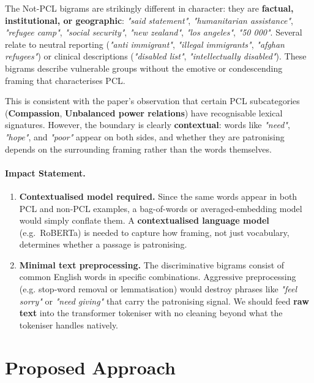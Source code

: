 \documentclass[11pt,a4paper]{article}
\begin{document}
The Not-PCL bigrams are strikingly different in character: they are \textbf{factual, institutional, or geographic}: \textit{"said statement"}, \textit{"humanitarian assistance"}, \textit{"refugee camp"}, \textit{"social security"}, \textit{"new zealand"}, \textit{"los angeles"}, \textit{"50 000"}. Several relate to neutral reporting (\textit{"anti immigrant"}, \textit{"illegal immigrants"}, \textit{"afghan refugees"}) or clinical descriptions (\textit{"disabled list"}, \textit{"intellectually disabled"}). These bigrams describe vulnerable groups without the emotive or condescending framing that characterises PCL.

This is consistent with the paper's observation that certain PCL subcategories (\textbf{Compassion}, \textbf{Unbalanced power relations}) have recognisable lexical signatures. However, the boundary is clearly \textbf{contextual}: words like \textit{"need"}, \textit{"hope"}, and \textit{"poor"} appear on both sides, and whether they are patronising depends on the surrounding framing rather than the words themselves.

\paragraph{Impact Statement.}

\begin{enumerate}
    \item \textbf{Contextualised model required.} Since the same words appear in both PCL and non-PCL examples, a bag-of-words or averaged-embedding model would simply conflate them. A \textbf{contextualised language model} (e.g.\ RoBERTa) is needed to capture how framing, not just vocabulary, determines whether a passage is patronising.
    \item \textbf{Minimal text preprocessing.} The discriminative bigrams consist of common English words in specific combinations. Aggressive preprocessing (e.g. stop-word removal or lemmatisation) would destroy phrases like \textit{"feel sorry"} or \textit{"need giving"} that carry the patronising signal. We should feed \textbf{raw text} into the transformer tokeniser with no cleaning beyond what the tokeniser handles natively.
\end{enumerate}

\section{Proposed Approach}
\label{sec:ex3}
\end{document}

